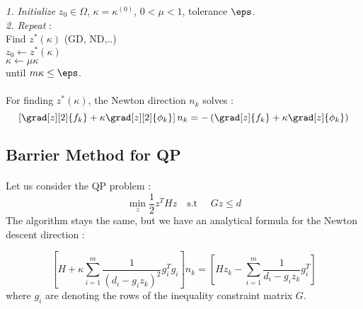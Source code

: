 \documentclass[a4paper]{article}
\begin{document}
{{			
			{
				\begin{algorithm}[H]
	 					\SetAlgoLined
						\LinesNumbered
						\emph{\textsf{1. Initialize}} $z_0\in\Omega$, $\kappa = \kappa^{(0)}$, $0<\mu<1$, tolerance $\eps$.\\
						\BlankLine
						\BlankLine
						\emph{\textsf{2. Repeat}} : \\
						\Indp \Indp 
							Find $z^*(\kappa)$ (GD, ND,..)\\
							$z_0 \leftarrow z^*(\kappa)$\\	
							$\kappa \leftarrow \mu \kappa	$\\
						\Indm \Indm 
						until $m\kappa \leq \eps$.
						\end{algorithm}
			}
			
			\paragraph{} For finding $z^*(\kappa)$, the Newton direction $n_k$ solves : 
			\begin{equation}
				\left[ \grad[z][2]{f_k} + \kappa \grad[z][2]{\phi_k}\right] n_k = -\left( \grad[z]{f_k} + \kappa \grad[z]{\phi_k}\right)
			\end{equation}
		}
		
		\subsection{Barrier Method for QP}
		{
			\paragraph{} Let us consider the QP problem : 
			\begin{equation}
				\min_z \frac{1}{2}{z^THz} \quad \text{s.t } \quad Gz \leq d 
			\end{equation}
			The algorithm stays the same, but we have an analytical formula for the Newton descent direction : 
			
			\begin{equation}
				\left[ H + \kappa \sum_{i=1}^m \frac{1}{(d_i-g_iz_k)^2} g_i^Tg_i\right] n_k = \left[ Hz_k - \sum_{i=1}^m \frac{1}{d_i-g_iz_k}g_i^T\right]
			\end{equation}
			where $g_i$ are denoting the rows of the inequality constraint matrix $G$. 
		}
	}
\end{document}
